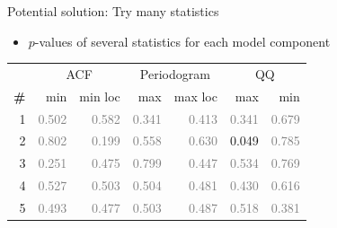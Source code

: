 \begin{frame}{Potential solution: Try many statistics}

\begin{itemize}
  \item $p$-values of several statistics for each model component
\end{itemize}

\vspace{\baselineskip}

\begin{center}
\begin{tabular}{|r|rr|rr|rr|}
\hline
 & \multicolumn{2}{c|}{ACF} & \multicolumn{2}{c|}{Periodogram} & \multicolumn{2}{c|}{QQ} \\
\bf{\#} & {min} & {min loc} & {max} & {max loc} & {max} & {min}\\
\hline

1 & \textcolor{gray}{0.502} & \textcolor{gray}{0.582} & \textcolor{gray}{0.341} & \textcolor{gray}{0.413} & \textcolor{gray}{0.341} & \textcolor{gray}{0.679}\\

2 & \textcolor{gray}{0.802} & \textcolor{gray}{0.199} & \textcolor{gray}{0.558} & \textcolor{gray}{0.630} & 0.049 & \textcolor{gray}{0.785}\\

3 & \textcolor{gray}{0.251} & \textcolor{gray}{0.475} & \textcolor{gray}{0.799} & \textcolor{gray}{0.447} & \textcolor{gray}{0.534} & \textcolor{gray}{0.769}\\

4 & \textcolor{gray}{0.527} & \textcolor{gray}{0.503} & \textcolor{gray}{0.504} & \textcolor{gray}{0.481} & \textcolor{gray}{0.430} & \textcolor{gray}{0.616}\\

5 & \textcolor{gray}{0.493} & \textcolor{gray}{0.477} & \textcolor{gray}{0.503} & \textcolor{gray}{0.487} & \textcolor{gray}{0.518} & \textcolor{gray}{0.381}\\

\hline
\end{tabular}
\end{center}

\end{frame}

